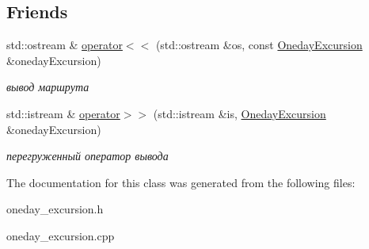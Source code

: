 \subsection*{Friends}
\begin{DoxyCompactItemize}
\item 
\hypertarget{class_oneday_excursion_a7e5f8b5bcaa5cdc59c3629e0b7e0f385}{}std\+::ostream \& \hyperlink{class_oneday_excursion_a7e5f8b5bcaa5cdc59c3629e0b7e0f385}{operator$<$$<$} (std\+::ostream \&os, const \hyperlink{class_oneday_excursion}{Oneday\+Excursion} \&oneday\+Excursion)\label{class_oneday_excursion_a7e5f8b5bcaa5cdc59c3629e0b7e0f385}

\begin{DoxyCompactList}\small\item\em вывод маршрута \end{DoxyCompactList}\item 
\hypertarget{class_oneday_excursion_af62b98b24ab8a6fc6401bf6c015c3cdc}{}std\+::istream \& \hyperlink{class_oneday_excursion_af62b98b24ab8a6fc6401bf6c015c3cdc}{operator$>$$>$} (std\+::istream \&is, \hyperlink{class_oneday_excursion}{Oneday\+Excursion} \&oneday\+Excursion)\label{class_oneday_excursion_af62b98b24ab8a6fc6401bf6c015c3cdc}

\begin{DoxyCompactList}\small\item\em перегруженный оператор вывода \end{DoxyCompactList}\end{DoxyCompactItemize}


The documentation for this class was generated from the following files\+:\begin{DoxyCompactItemize}
\item 
oneday\+\_\+excursion.\+h\item 
oneday\+\_\+excursion.\+cpp\end{DoxyCompactItemize}
